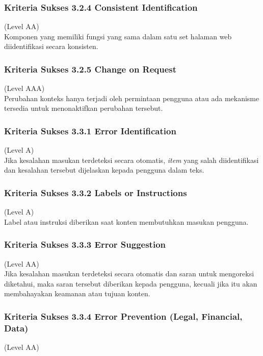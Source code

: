 \subsubsection{Kriteria Sukses 3.2.4 Consistent Identification}
\label{sec:kriteria_3.2.4}
(Level AA) \\

Komponen yang memiliki fungsi yang sama dalam satu set halaman web diidentifikasi secara konsisten.

\subsubsection{Kriteria Sukses 3.2.5 Change on Request}
\label{sec:kriteria_3.2.5}
(Level AAA) \\

Perubahan konteks hanya terjadi oleh permintaan pengguna atau ada mekanisme tersedia untuk menonaktifkan perubahan tersebut.

\subsubsection{Kriteria Sukses 3.3.1 Error Identification}
\label{sec:kriteria_3.3.1}
(Level A) \\

Jika kesalahan masukan terdeteksi secara otomatis, \textit{item} yang salah diidentifikasi dan kesalahan tersebut dijelaskan kepada pengguna dalam teks.

\subsubsection{Kriteria Sukses 3.3.2 Labels or Instructions}
\label{sec:kriteria_3.3.2}
(Level A) \\

Label atau instruksi diberikan saat konten membutuhkan masukan pengguna.

\subsubsection{Kriteria Sukses 3.3.3 Error Suggestion}
\label{sec:kriteria_3.3.3}
(Level AA) \\

Jika kesalahan masukan terdeteksi secara otomatis dan saran untuk mengoreksi diketahui, maka saran tersebut diberikan kepada pengguna, kecuali jika itu akan membahayakan keamanan atau tujuan konten.

\subsubsection{Kriteria Sukses 3.3.4 Error Prevention (Legal, Financial, Data)}
\label{sec:kriteria_3.3.4}
(Level AA) \\

